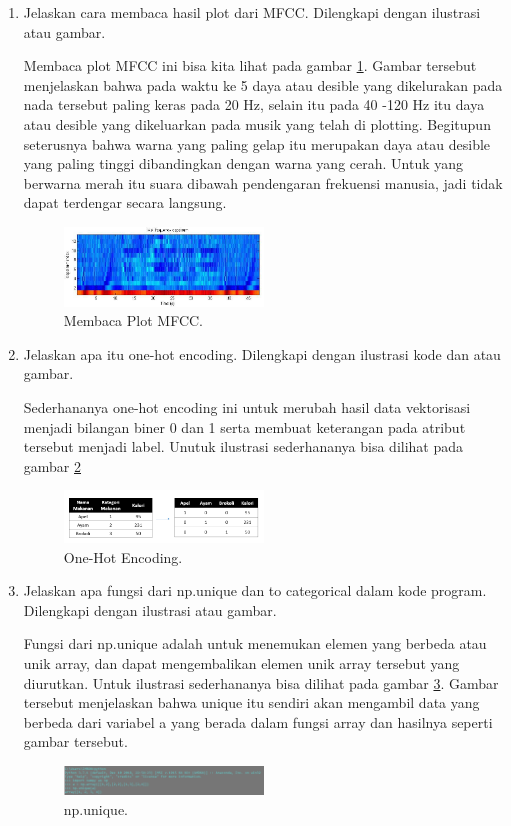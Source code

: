 \begin{enumerate}
\item Jelaskan cara membaca hasil plot dari MFCC. Dilengkapi dengan ilustrasi atau gambar. \par
Membaca plot MFCC ini bisa kita lihat pada gambar \ref{cc5}. Gambar tersebut menjelaskan bahwa pada waktu ke 5 daya atau desible yang dikelurakan pada nada tersebut paling keras pada 20 Hz, selain itu pada 40 -120 Hz itu daya atau desible yang dikeluarkan pada musik yang telah di plotting. Begitupun seterusnya bahwa warna yang paling gelap itu merupakan daya atau desible yang paling tinggi dibandingkan dengan warna yang cerah. Untuk yang berwarna merah itu suara dibawah pendengaran frekuensi manusia, jadi tidak dapat terdengar secara langsung. 
		\begin{figure}[!htbp]
		\centerline{\includegraphics[width=0.5\textwidth]{figures/im/cc5.png}}
		\caption{Membaca Plot MFCC.}
		\label{cc5}
		\end{figure}

\item Jelaskan apa itu one-hot encoding. Dilengkapi dengan ilustrasi kode dan atau gambar. \par
Sederhananya one-hot encoding ini untuk merubah hasil data vektorisasi menjadi bilangan biner 0 dan 1 serta membuat keterangan pada atribut tersebut menjadi label. Unutuk ilustrasi sederhananya bisa dilihat pada gambar \ref{cc6}
		\begin{figure}[!htbp]
		\centerline{\includegraphics[width=0.5\textwidth]{figures/im/cc6.png}}
		\caption{One-Hot Encoding.}
		\label{cc6}
		\end{figure}

\item Jelaskan apa fungsi dari np.unique dan to categorical dalam kode program. Dilengkapi dengan ilustrasi atau gambar. \par
Fungsi dari np.unique adalah untuk menemukan elemen yang berbeda atau unik array, dan dapat mengembalikan elemen unik array tersebut yang diurutkan. Untuk ilustrasi sederhananya bisa dilihat pada gambar \ref{cc7}. Gambar tersebut menjelaskan bahwa unique itu sendiri akan mengambil data yang berbeda dari variabel a yang berada dalam fungsi array dan hasilnya seperti gambar tersebut.
		\begin{figure}[!htbp]
		\centerline{\includegraphics[width=0.5\textwidth]{figures/im/cc7.png}}
		\caption{np.unique.}
		\label{cc7}
		\end{figure}


\end{enumerate}
